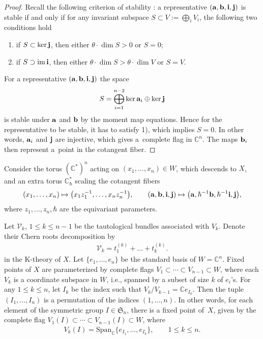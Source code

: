 \documentclass[pdftex]{sigma}
\def\C{{\mathbb C}}
\newcommand{\cV}{\mathcal{V}}
\numberwithin{equation}{section}
\begin{document}
\begin{proof} Recall the following criterion of stability \cite{Intro}: a representative $({\bf a, b, i, j})$ is stable if and only if for any invariant subspace $S\subset V := \bigoplus_i V_i$, the following two conditions hold
\begin{enumerate}\itemsep=0pt
\item[1)] if $S \subset \ker {\bf j}$, then either $\theta \cdot \dim S >0$ or $S = 0$;
\item[2)] if $S \supset \operatorname{im} {\bf i}$, then either $\theta \cdot \dim S > \theta \cdot \dim V$ or $S = V$.
\end{enumerate}
For a representative $({\bf a, b, i, j})$ the space
 \begin{gather*}
 S = \bigoplus_{i=1}^{n-2} \ker {\bf a}_i \oplus \ker {\bf j}
 \end{gather*}
is stable under ${\bf a}$ and ${\bf b}$ by the moment map equations. Hence for the representative to be stable, it has to satisfy 1), which implies $S = 0$. In other words, ${\bf a}_i$ and ${\bf j}$ are injective, which gives a~complete flag in $\C^n$. The maps ${\bf b}_i$ then represent a~point in the cotangent fiber.
\end{proof}

Consider the torus $(\C^*)^n$ acting on $(x_1, \dots, x_n) \in W$, which descends to $X$, and an extra torus $\C^*_\hbar$ scaling the cotangent fibers{\samepage
\begin{gather*}
(x_1, \dots, x_n) \mapsto \big(x_1 z_1^{-1}, \dots, x_n z_n^{-1}\big), \qquad ({\bf a, b, i, j}) \mapsto \big({\bf a}, \hbar^{-1} {\bf b}, \hbar^{-1} {\bf i}, {\bf j} \big) ,
\end{gather*}
where $z_1, \dots, z_n, \hbar$ are the equivariant parameters.}

Let $\cV_k$, $1\leq k\leq n-1$ be the tautological bundles associated with $V_k$. Denote their Chern roots decomposition by
\begin{gather*}
\cV_k = t_1^{(k)} + \dots + t_k^{(k)}.
\end{gather*}
in the K-theory of $X$. Let $\{e_1, \dots, e_n\}$ be the standard basis of $W = \C^n$. Fixed points of $X$ are parameterized by complete flags $V_1 \subset \cdots \subset V_{n-1} \subset W$, where each $V_k$ is a coordinate subspace in $W$, i.e., spanned by a subset of size $k$ of $e_i$'s. For any $1\leq k\leq n$, let $I_k$ be the index such that $V_k / V_{k-1} = \C e_{I_k}$. Then the tuple $(I_1, \dots, I_n)$ is a permutation of the indices $(1, \dots, n)$. In other words, for each element of the symmetric group $I\in \mathfrak{S}_n$, there is a fixed point of~$X$, given by the complete flag $V_1 (I) \subset \cdots \subset V_{n-1} (I) \subset W$, where
\begin{gather*}
V_k (I) = \mathrm{Span}_\C \{e_{I_1}, \dots, e_{I_k} \}, \qquad 1\leq k\leq n.
\end{gather*}
\end{document}
